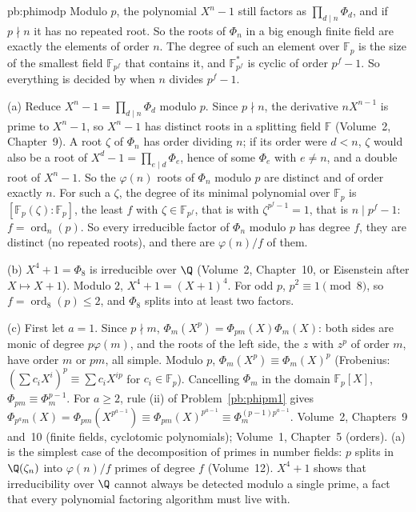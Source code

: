 \begin{solution}{pb:phimodp}
\idea Modulo $p$, the polynomial $X^n-1$ still factors as $\prod_{d\mid n}\Phi_d$, and if $p\nmid n$ it has no repeated root.
So the roots of $\Phi_n$ in a big enough finite field are exactly the elements of order $n$. The degree of such an element
over $\mathbb F_p$ is the size of the smallest field $\mathbb F_{p^f}$ that contains it, and $\mathbb F_{p^f}^*$ is cyclic of order
$p^f-1$. So everything is decided by when $n$ divides $p^f-1$.

\writeup (a) Reduce $X^n-1=\prod_{d\mid n}\Phi_d$ modulo $p$. Since $p\nmid n$, the derivative $nX^{n-1}$ is prime to $X^n-1$, so
$X^n-1$ has distinct roots in a splitting field $\mathbb F$ (Volume~2, Chapter~9). A root $\zeta$ of $\Phi_n$ has order dividing
$n$; if its order were $d<n$, $\zeta$ would also be a root of $X^d-1=\prod_{e\mid d}\Phi_e$, hence of some $\Phi_e$ with $e\ne n$,
and a double root of $X^n-1$. So the $\varphi(n)$ roots of $\Phi_n$ modulo $p$ are distinct and of order exactly $n$. For such
a $\zeta$, the degree of its minimal polynomial over $\mathbb F_p$ is $[\mathbb F_p(\zeta):\mathbb F_p]$, the least $f$ with
$\zeta\in\mathbb F_{p^f}$, that is with $\zeta^{p^f-1}=1$, that is $n\mid p^f-1$: $f=\operatorname{ord}_n(p)$. So every irreducible
factor of $\Phi_n$ modulo $p$ has degree $f$, they are distinct (no repeated roots), and there are $\varphi(n)/f$ of them.

(b) $X^4+1=\Phi_8$ is irreducible over $\Q$ (Volume~2, Chapter~10, or Eisenstein after $X\mapsto X+1$). Modulo $2$,
$X^4+1=(X+1)^4$. For odd $p$, $p^2\equiv1\pmod8$, so $f=\operatorname{ord}_8(p)\le2$, and $\Phi_8$ splits into at least two factors.

(c) First let $a=1$. Since $p\nmid m$, $\Phi_m(X^p)=\Phi_{pm}(X)\Phi_m(X)$: both sides are monic of degree $p\varphi(m)$, and
the roots of the left side, the $z$ with $z^p$ of order $m$, have order $m$ or $pm$, all simple. Modulo $p$,
$\Phi_m(X^p)\equiv\Phi_m(X)^p$ (Frobenius: $(\sum c_iX^i)^p\equiv\sum c_iX^{ip}$ for $c_i\in\mathbb F_p$). Cancelling $\Phi_m$ in the
domain $\mathbb F_p[X]$, $\Phi_{pm}\equiv\Phi_m^{p-1}$. For $a\ge2$, rule (ii) of Problem~\ref{pb:phipm1} gives
$\Phi_{p^am}(X)=\Phi_{pm}(X^{p^{a-1}})\equiv\Phi_{pm}(X)^{p^{a-1}}\equiv\Phi_m^{(p-1)p^{a-1}}$.
\tools Volume~2, Chapters~9 and~10 (finite fields, cyclotomic polynomials); Volume~1, Chapter~5 (orders).
\leads (a) is the simplest case of the decomposition of primes in number fields: $p$ splits in $\Q(\zeta_n)$ into
$\varphi(n)/f$ primes of degree $f$ (Volume~12). $X^4+1$ shows that irreducibility over $\Q$ cannot always be detected modulo a
single prime, a fact that every polynomial factoring algorithm must live with.
\end{solution}

